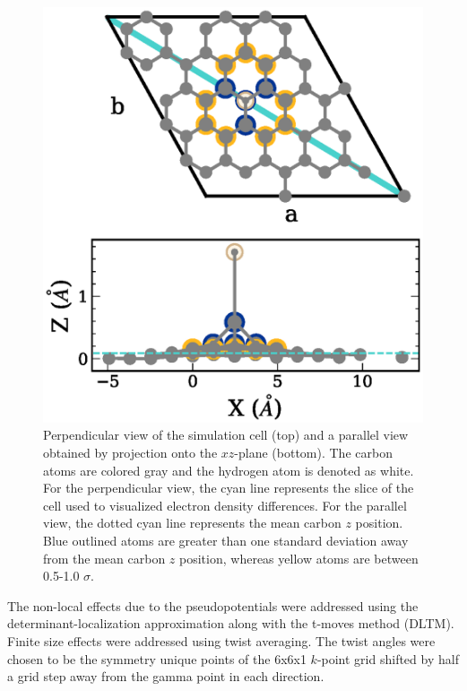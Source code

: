 \begin{figure}
    \centering
    \includegraphics[width=\columnwidth,keepaspectratio]{Images/chapter4/hgraphene_python.eps}
    \caption{ Perpendicular view of the simulation cell (top) and a parallel view obtained by projection onto the $xz$-plane (bottom). The carbon atoms are colored gray and the hydrogen atom is denoted as white. For the perpendicular view, the cyan line represents the slice of the cell used to visualized electron density differences. For the parallel view, the dotted cyan line represents the mean carbon $z$ position. Blue outlined atoms are greater than one standard deviation away from the mean carbon $z$ position, whereas yellow atoms are between 0.5-1.0 $\sigma$.}
    \label{fig:cell}
\end{figure}
The non-local effects due to the pseudopotentials were addressed using the determinant-localization approximation along with the t-moves method (DLTM).\cite{10.1063/1.5119729, 10.1063/1.3380831}
Finite size effects were addressed using twist averaging.\cite{10.1103/PhysRevE.64.016702} The twist angles were chosen to be the symmetry unique points of the 6x6x1 $k$-point grid shifted by half a grid step away from the gamma point in each direction.

